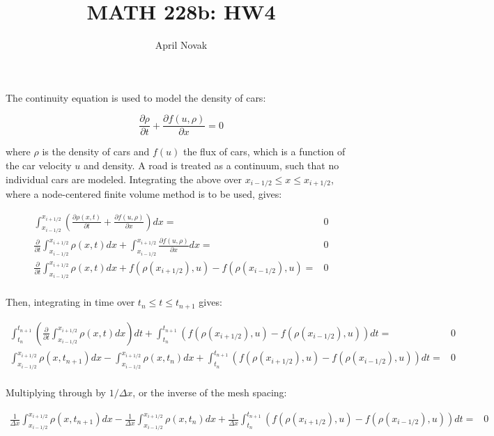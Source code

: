 \documentclass[10pt]{article}
\newcommand{\beq}{\begin{equation}}
\newcommand{\eeq}{\end{equation}}
\newcommand{\beqa}{\begin{equation}\begin{aligned}}
\newcommand{\eeqa}{\end{aligned}\end{equation}}
\begin{document}
\title{MATH 228b: HW4}
\author{April Novak}

\maketitle

\section{}

The continuity equation is used to model the density of cars:

\beq
\frac{\partial\rho}{\partial t}+\frac{\partial f(u, \rho)}{\partial x}=0
\eeq

where \(\rho\) is the density of cars and \(f(u)\) the flux of cars, which is a function of the car velocity \(u\) and density. A road is treated as a continuum, such that no individual cars are modeled. Integrating the above over \(x_{i-1/2}\leq x\leq x_{i+1/2}\), where a node-centered finite volume method is to be used, gives:

\beqa
\int_{x_{i-1/2}}^{x_{i+1/2}}\left(\frac{\partial\rho(x,t)}{\partial t}+\frac{\partial f(u, \rho)}{\partial x}\right)dx=&0\\
\frac{\partial}{\partial t}\int_{x_{i-1/2}}^{x_{i+1/2}}\rho(x,t) dx+\int_{x_{i-1/2}}^{x_{i+1/2}}\frac{\partial f(u, \rho)}{\partial x}dx=&0\\
\frac{\partial}{\partial t}\int_{x_{i-1/2}}^{x_{i+1/2}}\rho(x,t) dx+f(\rho(x_{i+1/2}), u)-f(\rho(x_{i-1/2}), u)=&0\\
\eeqa

Then, integrating in time over \(t_{n}\leq t\leq t_{n+1}\) gives:

\beqa
\int_{t_n}^{t_{n+1}}\left(\frac{\partial}{\partial t}\int_{x_{i-1/2}}^{x_{i+1/2}}\rho(x,t) dx\right)dt+\int_{t_n}^{t_{n+1}}\left(f(\rho(x_{i+1/2}), u)-f(\rho(x_{i-1/2}), u)\right)dt=&0\\
\int_{x_{i-1/2}}^{x_{i+1/2}}\rho(x, t_{n+1}) dx-\int_{x_{i-1/2}}^{x_{i+1/2}}\rho(x, t_{n}) dx+\int_{t_n}^{t_{n+1}}\left(f(\rho(x_{i+1/2}), u)-f(\rho(x_{i-1/2}), u)\right)dt=&0\\
\eeqa

Multiplying through by \(1/\Delta x\), or the inverse of the mesh spacing:

\beqa
\label{eq:1}
\frac{1}{\Delta x}\int_{x_{i-1/2}}^{x_{i+1/2}}\rho(x, t_{n+1}) dx-\frac{1}{\Delta x}\int_{x_{i-1/2}}^{x_{i+1/2}}\rho(x, t_{n}) dx+\frac{1}{\Delta x}\int_{t_n}^{t_{n+1}}\left(f(\rho(x_{i+1/2}), u)-f(\rho(x_{i-1/2}), u)\right)dt=&0\\
\eeqa
\end{document}
